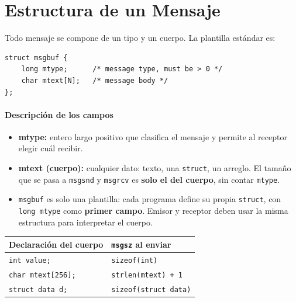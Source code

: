 \documentclass[12pt,a4paper]{article}
\begin{document}
\newpage

\section{Estructura de un Mensaje}
Todo mensaje se compone de un tipo y un cuerpo. La plantilla estándar es:

\begin{lstlisting}[numbers=none]
struct msgbuf {
    long mtype;      /* message type, must be > 0 */
    char mtext[N];   /* message body */
};
\end{lstlisting}

\begin{center}
\end{center}

\paragraph{Descripción de los campos}
\begin{itemize}
    \item \textbf{mtype:} entero largo positivo que clasifica el mensaje y permite al receptor elegir cuál recibir.
    \item \textbf{mtext (cuerpo):} cualquier dato: texto, una \texttt{struct}, un arreglo. El tamaño que se pasa a \texttt{msgsnd} y \texttt{msgrcv} es \textbf{solo el del cuerpo}, sin contar \texttt{mtype}.
    \item \texttt{msgbuf} es solo una plantilla: cada programa define su propia \texttt{struct}, con \texttt{long mtype} como \textbf{primer campo}. Emisor y receptor deben usar la misma estructura para interpretar el cuerpo.
\end{itemize}

\begin{table}[h]
\centering
\small
\begin{tabular}{|l|l|}
\hline
\textbf{Declaración del cuerpo} & \textbf{\texttt{msgsz} al enviar} \\ \hline
\texttt{int value;} & \texttt{sizeof(int)} \\ \hline
\texttt{char mtext[256];} & \texttt{strlen(mtext) + 1} \\ \hline
\texttt{struct data d;} & \texttt{sizeof(struct data)} \\ \hline
\end{tabular}
\end{table}
\end{document}
